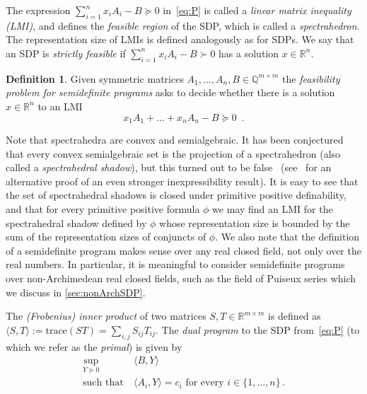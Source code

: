 \documentclass[11pt]{article}
\theoremstyle{definition}
\newtheorem{definition}[theorem]{Definition}
\theoremstyle{remark}
\newcommand{\R}{\mathbb{R}}
\begin{document}
The expression $\sum_{i=1}^n x_i A_i -B \succeq 0$ in~\cref{eq:P} is called a \emph{linear matrix inequality (LMI)}, and defines the \emph{feasible region} of the SDP, which  
is called a  \emph{spectrahedron}. 
The representation size of LMIs is defined analogously as for SDPs. 
We say that an SDP is \emph{strictly feasible} if $\sum_{i=1}^n x_i A_i - B \succ 0$ has a solution $x \in {\mathbb R}^n$.

\begin{definition}\label{def:sdfp}
    Given symmetric matrices $A_1,\dots,A_n,B \in {\mathbb Q}^{m \times m}$ the \emph{feasibility problem for semidefinite programs} asks to decide whether there is a solution $x \in \R^n$ to an LMI  
    \[
    x_1A_1 + \dots + x_nA_n - B \succeq 0 \enspace .
    \]
\end{definition}

Note that spectrahedra are convex and semialgebraic.
It has been conjectured that every convex semialgebraic set is the projection of a spectrahedron (also called a \emph{spectrahedral shadow}), but this turned out to be false~\cite{scheiderer_helton_nie} (see~\cite{BodKummerThom} for an alternative proof of an even stronger inexpressibility result). 
It is easy to see that the set of spectrahedral shadows is closed under primitive positive definability, and that 
for every primitive positive formula $\phi$ 
we may find an LMI for the 
spectrahedral shadow defined by $\phi$ whose representation size is bounded by the
sum of the representation sizes of conjuncts of $\phi$. We also note that the definition of a semidefinite program makes sense over any real closed field, not only over the real numbers. In particular, it is meaningful to consider semidefinite programs over non-Archimedean real closed fields, such as the field of Puiseux series which we discuss in \cref{sec:nonArchSDP}.


The \emph{(Frobenius) inner product} of two matrices $S,T \in {\mathbb R}^{m \times m}$ is defined as $\langle S,T \rangle := \text{trace}(ST) = \sum_{i,j} S_{ij} T_{ij}$. 
The \emph{dual program} to the SDP from~\cref{eq:P} (to which we refer as the \emph{primal}) is given by
\begin{equation}\label{eq:dual}\tag{D}
\begin{aligned}
    \sup_{Y \succeq 0} \ &\langle B, Y \rangle \\
     \text{such that}  \ &\langle A_i,Y \rangle = c_i \text{ for every } i \in \{1,\dots,n\} 
     \, .
\end{aligned}
\end{equation}
\end{document}
